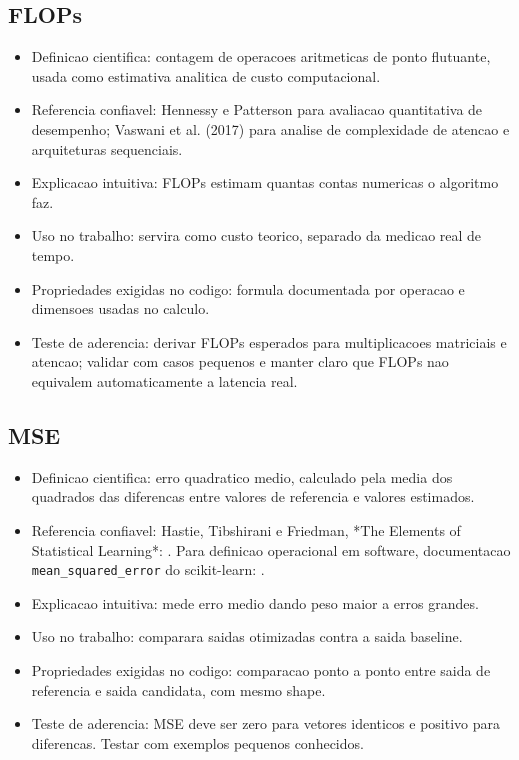 \subsection{FLOPs}


\begin{itemize}
\item Definicao cientifica: contagem de operacoes aritmeticas de ponto flutuante,
usada como estimativa analitica de custo computacional.
\item Referencia confiavel: Hennessy e Patterson para avaliacao quantitativa de
desempenho; Vaswani et al. (2017) para analise de complexidade de atencao e
arquiteturas sequenciais.
\item Explicacao intuitiva: FLOPs estimam quantas contas numericas o algoritmo faz.
\item Uso no trabalho: servira como custo teorico, separado da medicao real de
tempo.
\item Propriedades exigidas no codigo: formula documentada por operacao e dimensoes
usadas no calculo.
\item Teste de aderencia: derivar FLOPs esperados para multiplicacoes matriciais e
atencao; validar com casos pequenos e manter claro que FLOPs nao equivalem
automaticamente a latencia real.
\end{itemize}


\subsection{MSE}


\begin{itemize}
\item Definicao cientifica: erro quadratico medio, calculado pela media dos
quadrados das diferencas entre valores de referencia e valores estimados.
\item Referencia confiavel: Hastie, Tibshirani e Friedman, *The Elements of
Statistical Learning*: . Para
definicao operacional em software, documentacao \texttt{mean\_\allowbreak{}squared\_\allowbreak{}error} do
scikit-learn:
.
\item Explicacao intuitiva: mede erro medio dando peso maior a erros grandes.
\item Uso no trabalho: comparara saidas otimizadas contra a saida baseline.
\item Propriedades exigidas no codigo: comparacao ponto a ponto entre saida de
referencia e saida candidata, com mesmo shape.
\item Teste de aderencia: MSE deve ser zero para vetores identicos e positivo para
diferencas. Testar com exemplos pequenos conhecidos.
\end{itemize}


